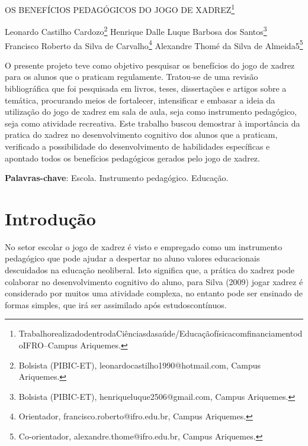 \documentclass[article,12pt,onesidea,4paper,english,brazil]{abntex2}
\begin{document}
	
	
	\frenchspacing 
	
	\begin{center}
		\LARGE OS BENEFÍCIOS PEDAGÓGICOS DO JOGO DE XADREZ\footnote{TrabalhorealizadodentrodaCiênciasdasaúde/EducaçãofísicacomfinanciamentodoIFRO–Campus Ariquemes.}
		
		\normalsize
		Leonardo Castilho Cardozo\footnote{Bolsista (PIBIC-ET), leonardocastilho1990@hotmail.com, Campus Ariquemes.} 
		Henrique Dalle Luque Barbosa dos Santos\footnote{Bolsista (PIBIC-ET), henriqueluque2506@gmail.com, Campus Ariquemes.} 
		Francisco Roberto da Silva de Carvalho\footnote{Orientador, francisco.roberto@ifro.edu.br, Campus Ariquemes.} 
		Alexandre Thomé da Silva de Almeida5\footnote{Co-orientador, alexandre.thome@ifro.edu.br, Campus Ariquemes.} 
	\end{center}
	
	\begin{resumoumacoluna}
		O presente projeto teve como objetivo pesquisar os benefícios do jogo de xadrez para os alunos que o praticam regulamente. Tratou-se de uma revisão bibliográfica que foi pesquisada em livros, teses, dissertações e artigos sobre a temática, procurando meios de fortalecer, intensificar e embasar a ideia da utilização do jogo de xadrez em sala de aula, seja como instrumento pedagógico, seja como atividade recreativa. Este trabalho buscou demostrar à importância da pratica do xadrez no desenvolvimento cognitivo dos alunos que a praticam, verificado a possibilidade do desenvolvimento de habilidades específicas e apontado todos os benefícios pedagógicos gerados pelo jogo de xadrez.
		
		\vspace{\onelineskip}
		
		\noindent
		\textbf{Palavras-chave}: Escola. Instrumento pedagógico. Educação.
	\end{resumoumacoluna}
	
	\textual
	
	\section*{Introdução}
	
	No setor escolar o jogo de xadrez é visto e empregado como um instrumento pedagógico que pode ajudar a despertar no aluno valores educacionais descuidados na educação neoliberal. Isto significa que, a prática do xadrez pode colaborar no desenvolvimento cognitivo do aluno, para Silva (2009) jogar xadrez é considerado por muitos uma atividade complexa, no entanto pode ser ensinado de formas simples, que irá ser assimilado após estudoscontínuos.
	
\end{document}
